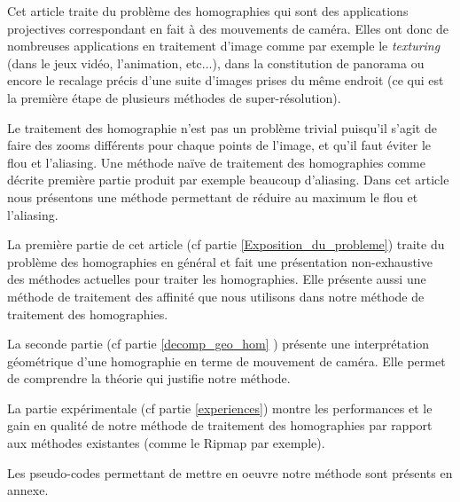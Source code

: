 	Cet article traite du problème des homographies qui sont des applications projectives correspondant en fait à des mouvements de caméra. Elles ont donc de nombreuses applications en traitement d'image comme par exemple le \emph{texturing} (dans le jeux vidéo, l'animation, etc...), dans la constitution de panorama \cite{brown2007automatic} ou encore le recalage précis d'une suite d'images prises du même endroit (ce qui est la première étape de plusieurs méthodes de super-résolution).

	Le traitement des homographie n'est pas un problème trivial puisqu'il s'agit de faire des zooms différents pour chaque points de l'image, et qu'il faut éviter le flou et l'aliasing. Une méthode naïve de traitement des homographies comme décrite première partie produit par exemple beaucoup d'aliasing. Dans cet article nous présentons une méthode permettant de réduire au maximum le flou et l'aliasing.

	La première partie de cet article (cf partie \ref{Exposition_du_probleme}) traite du problème des homographies en général et fait une présentation non-exhaustive des méthodes actuelles pour traiter les homographies. Elle présente aussi une méthode de traitement des affinité que nous utilisons dans notre méthode de traitement des homographies. 

	La seconde partie (cf partie \ref{decomp_geo_hom} ) présente une interprétation géométrique d'une homographie en terme de mouvement de caméra. Elle permet de comprendre la théorie qui justifie notre méthode.

	La partie expérimentale (cf partie \ref{experiences}) montre les performances et le gain en qualité de notre méthode de traitement des homographies par rapport aux méthodes existantes (comme le Ripmap par exemple).

	Les pseudo-codes permettant de mettre en oeuvre notre méthode sont présents en annexe.
